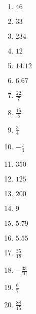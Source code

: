 \documentclass[10pt]{exam}
\begin{document}
\newpage

\begin{multicols*}{2}
\begin{enumerate}
\item \( 46 \)
\item \( 33 \)
\item \( 234 \)
\item \( 12 \)
\item \( 14.12 \)
\item \( 6.67 \)
\item \(\displaystyle \frac{22}{7} \)
\item \(\displaystyle \frac{15}{8} \)
\item \(\displaystyle \frac{3}{4} \)
\item \(\displaystyle -\frac{7}{4} \)
\item \( 350 \)
\item \( 125 \)
\item \( 200 \)
\item \( 9 \)
\item \( 5.79 \)
\item \( 5.55 \)
\item \(\displaystyle \frac{35}{18} \)
\item \(\displaystyle -\frac{33}{10} \)
\item \(\displaystyle \frac{6}{7} \)
\item \(\displaystyle \frac{88}{15} \)
\end{enumerate}
\end{multicols*}
\end{document}
